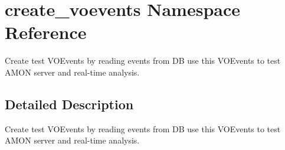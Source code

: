 \hypertarget{namespacecreate__voevents}{\section{create\-\_\-voevents Namespace Reference}
\label{namespacecreate__voevents}
}


Create test V\-O\-Events by reading events from D\-B use this V\-O\-Events to test A\-M\-O\-N server and real-\/time analysis.  




\subsection{Detailed Description}
Create test V\-O\-Events by reading events from D\-B use this V\-O\-Events to test A\-M\-O\-N server and real-\/time analysis. 